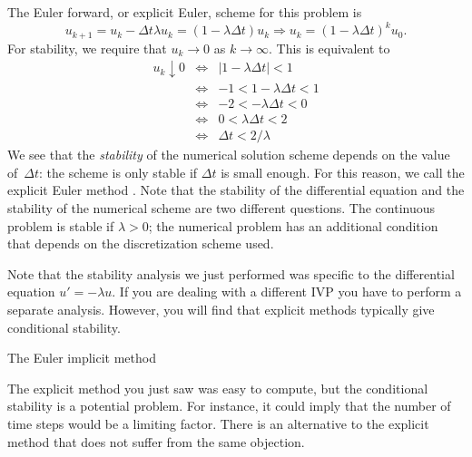 The Euler forward, or explicit Euler, scheme for this problem is
\begin{equation}
  u_{k+1}=u_k-\Delta t \lambda u_k=(1-\lambda \Delta t)u_k
  \Rightarrow
  u_k=(1-\lambda\Delta t)^ku_0.
\end{equation}
For stability, we require that
$u_k\rightarrow 0$ as $k\rightarrow\infty$. This is equivalent to
  \begin{eqnarray*}
    u_k\downarrow 0
    &\Leftrightarrow&|1-\lambda \Delta t|<1\\
    &\Leftrightarrow&-1<1-\lambda\Delta t<1\\
    &\Leftrightarrow&-2<-\lambda\Delta t<0\\
    &\Leftrightarrow&0<\lambda\Delta t<2\\
    &\Leftrightarrow&\Delta t<2/\lambda
  \end{eqnarray*}
We see that the \emph{stability}
of the numerical solution scheme depends on
the value of~$\Delta t$: the scheme is only stable if $\Delta t$ is
small enough.  For this reason, we call the explicit Euler method
. Note that the stability of the
differential equation and the stability of the numerical scheme are
two different questions. The continuous problem is stable if
$\lambda>0$; the numerical problem has an additional condition that
depends on the discretization scheme used.

Note that the stability analysis we just performed was specific to the
differential equation $u'=-\lambda u$. If you are dealing with a
different \ac{IVP} you have to perform a separate analysis. However,
you will find that explicit methods typically give conditional stability.


 {The Euler implicit method}
\label{sec:implicit-euler}

The explicit method you just saw was easy to compute, but the
conditional stability is a potential problem. For instance, it could
imply that the number of time steps would be a limiting factor.
There is an alternative to the explicit method that does not suffer
from the same objection.

